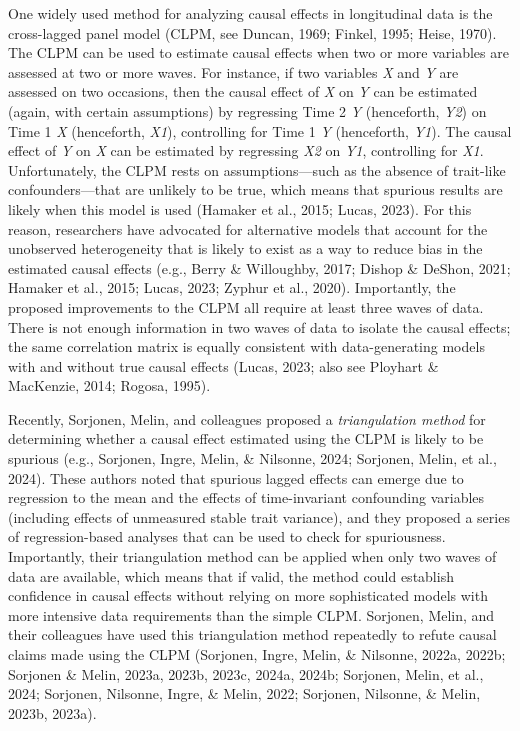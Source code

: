 \documentclass[
  man,mask,floatsintext]{apa6}
\begin{document}
One widely used method for analyzing causal effects in longitudinal data is the cross-lagged panel model (CLPM, see Duncan, 1969; Finkel, 1995; Heise, 1970). The CLPM can be used to estimate causal effects when two or more variables are assessed at two or more waves. For instance, if two variables \emph{X} and \emph{Y} are assessed on two occasions, then the causal effect of \emph{X} on \emph{Y} can be estimated (again, with certain assumptions) by regressing Time 2 \emph{Y} (henceforth, \emph{Y2}) on Time 1 \emph{X} (henceforth, \emph{X1}), controlling for Time 1 \emph{Y} (henceforth, \emph{Y1}). The causal effect of \emph{Y} on \emph{X} can be estimated by regressing \emph{X2} on \emph{Y1}, controlling for \emph{X1}. Unfortunately, the CLPM rests on assumptions---such as the absence of trait-like confounders---that are unlikely to be true, which means that spurious results are likely when this model is used (Hamaker et al., 2015; Lucas, 2023). For this reason, researchers have advocated for alternative models that account for the unobserved heterogeneity that is likely to exist as a way to reduce bias in the estimated causal effects (e.g., Berry \& Willoughby, 2017; Dishop \& DeShon, 2021; Hamaker et al., 2015; Lucas, 2023; Zyphur et al., 2020). Importantly, the proposed improvements to the CLPM all require at least three waves of data. There is not enough information in two waves of data to isolate the causal effects; the same correlation matrix is equally consistent with data-generating models with and without true causal effects (Lucas, 2023; also see Ployhart \& MacKenzie, 2014; Rogosa, 1995).

Recently, Sorjonen, Melin, and colleagues proposed a \emph{triangulation method} for determining whether a causal effect estimated using the CLPM is likely to be spurious (e.g., Sorjonen, Ingre, Melin, \& Nilsonne, 2024; Sorjonen, Melin, et al., 2024). These authors noted that spurious lagged effects can emerge due to regression to the mean and the effects of time-invariant confounding variables (including effects of unmeasured stable trait variance), and they proposed a series of regression-based analyses that can be used to check for spuriousness. Importantly, their triangulation method can be applied when only two waves of data are available, which means that if valid, the method could establish confidence in causal effects without relying on more sophisticated models with more intensive data requirements than the simple CLPM. Sorjonen, Melin, and their colleagues have used this triangulation method repeatedly to refute causal claims made using the CLPM (Sorjonen, Ingre, Melin, \& Nilsonne, 2022a, 2022b; Sorjonen \& Melin, 2023a, 2023b, 2023c, 2024a, 2024b; Sorjonen, Melin, et al., 2024; Sorjonen, Nilsonne, Ingre, \& Melin, 2022; Sorjonen, Nilsonne, \& Melin, 2023b, 2023a).
\end{document}
